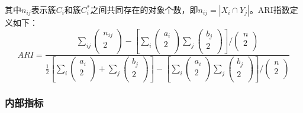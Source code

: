 其中$n_{ij}$表示簇$C_{i}$和簇$C_{i}^{*}$之间共同存在的对象个数，即$n_{i j}=\left|X_{i} \cap Y_{j}\right|$。ARI指数定义如下：
\begin{equation}
\label{ARI}
ARI=\frac{\sum_{ij}{\left( \begin{array}{c}
	n_{ij}\\
	2\\
\end{array} \right)}-\left[ \sum_i{\left( \begin{array}{c}
	a_i\\
	2\\
\end{array} \right)}\sum_j{\left( \begin{array}{c}
	b_j\\
	2\\
\end{array} \right)} \right] /\left( \begin{array}{c}
	n\\
	2\\
\end{array} \right)}{\frac{1}{2}\left[ \sum_i{\left( \begin{array}{c}
	a_i\\
	2\\
\end{array} \right)}+\sum_j{\left( \begin{array}{c}
	b_j\\
	2\\
\end{array} \right)} \right] -\left[ \sum_i{\left( \begin{array}{c}
	a_i\\
	2\\
\end{array} \right)}\sum_j{\left( \begin{array}{c}
	b_j\\
	2\\
\end{array} \right)} \right] /\left( \begin{array}{c}
	n\\
	2\\
\end{array} \right)}
\end{equation}

\subsubsection{内部指标}

